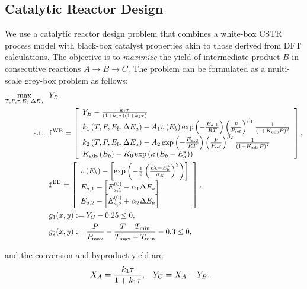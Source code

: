 \documentclass[12pt,a4paper]{article}%
\theoremstyle{plain}%
\theoremstyle{remark}%
\theoremstyle{definition}%
\def\WB{\mathrm{WB}}
\def\BB{\mathrm{BB}}
\newcommand{\bff}{{\bf f}}
\begin{document}
\begin{appendices}
\subsection{Catalytic Reactor Design}\label{subsec:app_cstr}
We use a catalytic reactor design problem that combines a white-box CSTR process model with black-box catalyst properties akin to those derived from DFT calculations. The objective is to \emph{maximize} the yield of intermediate product $B$ in consecutive reactions $A \to B \to C$. The problem can be formulated as a multi-scale grey-box problem as follows:
\begin{align} \label{eq:CSTR}
    \max_{T, P, \tau, E_b, \Delta E_a} &~~ Y_B \\\notag
    \text{s.t.} &~~ \bff^\WB=\left[
        \begin{array}{l}
            Y_B-\frac{k_1 \tau}{\left(1+k_1 \tau\right)\left(1+k_2 \tau\right)} \\
            k_1\left(T, P, E_b, \Delta E_a\right)-A_1 v\left(E_b\right) \exp \left(-\frac{E_{a, 1}}{R T}\right)\left(\frac{P}{P_{\mathrm{ref}}}\right)^{\beta_1} \frac{1}{\left(1+K_{\mathrm{ads}} P\right)^2} \\
            k_2\left(T, P, E_b, \Delta E_a\right)-A_2 \exp \left(-\frac{E_{a, 2}}{R T}\right)\left(\frac{P}{P_{\mathrm{ref}}}\right)^{\beta_2} \frac{1}{\left(1+K_{\mathrm{ads}} P\right)^2} \\
            K_{\mathrm{ads}}\left(E_b\right) - K_0 \exp\left(\kappa \left(E_b - E_b^*\right)\right)
        \end{array}\right], \\\notag
    &~~ \bff^\BB=\left[
        \begin{array}{l}
            v\left(E_b\right)-\left[\exp \left(-\frac{1}{2}\left(\frac{E_b-E_b^*}{\sigma_E}\right)^2\right)\right] \\
            E_{a, 1}-\left[E_{a, 1}^{(0)}-\alpha_1 \Delta E_a\right] \\
            E_{a, 2}-\left[E_{a, 2}^{(0)}+\alpha_2 \Delta E_a\right]
        \end{array}\right], \\\notag
    &~~ g_1(x, y) := Y_C - 0.25 \leq 0, \\\notag
    &~~ g_2(x, y) := \frac{P}{P_{\max}} - \frac{T - T_{\min}}{T_{\max} - T_{\min}} - 0.3 \leq 0,
\end{align}

and the conversion and byproduct yield are:
\begin{align}\notag
    X_A &= \frac{k_1 \tau}{1 + k_1 \tau}, & Y_C &= X_A - Y_B.
\end{align}


\end{appendices}
\end{document}
